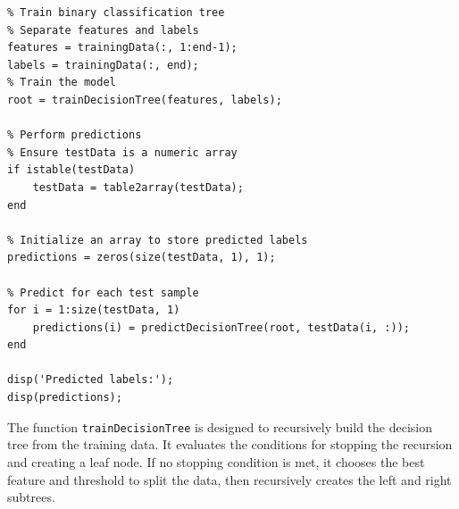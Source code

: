 \documentclass[12pt, onecolumn]{article}
\begin{document}
\begin{verbatim}
% Train binary classification tree
% Separate features and labels
features = trainingData(:, 1:end-1);
labels = trainingData(:, end);
% Train the model
root = trainDecisionTree(features, labels);

% Perform predictions
% Ensure testData is a numeric array
if istable(testData)
    testData = table2array(testData);
end

% Initialize an array to store predicted labels
predictions = zeros(size(testData, 1), 1);

% Predict for each test sample
for i = 1:size(testData, 1)
    predictions(i) = predictDecisionTree(root, testData(i, :));
end

disp('Predicted labels:');
disp(predictions);

\end{verbatim}



The function \texttt{trainDecisionTree} is designed to recursively build the decision tree from the training data. It evaluates the conditions for stopping the recursion and creating a leaf node. If no stopping condition is met, it chooses the best feature and threshold to split the data, then recursively creates the left and right subtrees.
\end{document}
